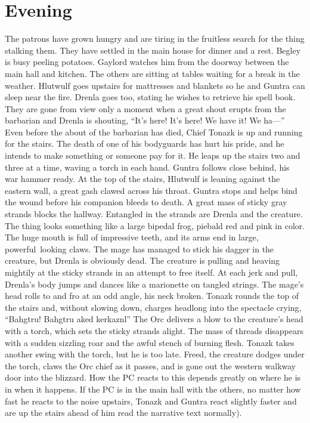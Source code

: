 \documentclass[a5paper,11pt,twoside]{book}
\begin{document}
{{{\section*{Evening} The patrons have grown hungry and are tiring in the fruitless search for the thing stalking them.
They have settled in the main house for dinner and a rest.
Begley is busy peeling potatoes.
Gaylord watches him from the doorway between the main hall and kitchen.
The others are sitting at tables waiting for a break in the weather.
Hlutwulf goes upstairs for mattresses and blankets so he and Guntra can sleep near the fire.
Drenla goes too, stating he wishes to retrieve his spell book.
They are gone from view only a moment when a great shout erupts from the barbarian and Drenla is shouting, “It’s here! It’s here! We have it! We ha—” Even before the about of the barbarian has died, Chief Tonazk is up and running for the stairs.
The death  of one of his bodyguards has hurt his pride, and he intends to make something or someone pay for it.
He leaps up the stairs two and three at a time, waving a torch in each hand.
Guntra follows close behind, his war hammer ready.
At the top of the stairs, Hlutwulf is leaning against the eastern wall, a great gash clawed across his throat.
Guntra stops and helps bind the wound before his companion bleeds to death.
A great mass of sticky gray strands blocks the hallway.
Entangled in the strands are Drenla and the creature.
The thing looks something like a large bipedal frog, piebald red and pink in color.
The huge mouth is full of impressive teeth, and its arms end in large, powerful~looking claws.
The mage has managed to stick his dagger in the creature, but Drenla is obviously dead.
The creature is pulling and heaving mightily at the sticky strands in an attempt to free itself.
At each jerk and pull, Drenla’s body jumps and dances like a marionette on tangled strings.
The mage’s head rolls to and fro at an odd angle, his neck broken.
Tonazk rounds the top of the stairs and, without slowing down, charges headlong into the spectacle crying, “Bahgtru! Bahgtru aked kerkaznl” The Orc delivers a blow to the creature’s head with a torch, which sets the sticky strands alight.
The mass of threads disappears with a sudden sizzling roar and the awful stench of burning flesh.
Tonazk takes another swing with the torch, but he is too late.
Freed, the creature dodges under the torch, claws the Orc chief as it passes, and is gone out the western walkway door into the blizzard.
How the PC reacts to this depends greatly on where he is in when it happens.
If the PC is in the main hall with the others, no matter how fast he reacts to the noise upstairs, Tonazk and Guntra react slightly faster and are up the stairs ahead of him {read the narrative text normally).
}}}}
\end{document}

